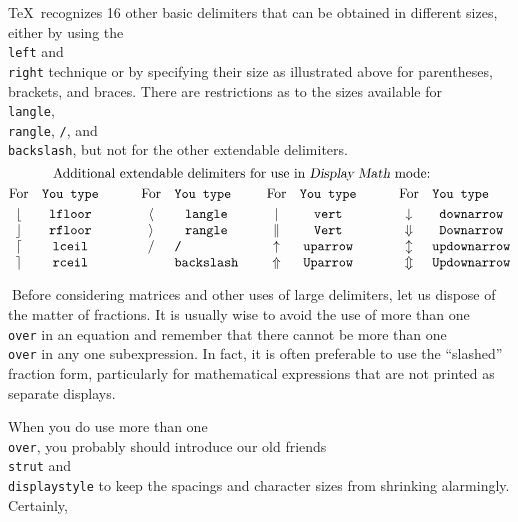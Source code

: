 \TeX\ recognizes 16 other basic
delimiters that can be obtained in different sizes, either by using the {\tt
\\left} and {\tt \\right} technique or by specifying their size as
illustrated above for parentheses, brackets, and braces.
There are restrictions as to the sizes available for {\tt \\langle}, {\tt
\\rangle}, {\tt /}, and {\tt \\backslash}, but not for the other extendable
delimiters.
$$\vbox{\halign{\hfil$#$\hfil\quad&\tt #\hfil\qquad\quad&
\hfil$#$\hfil\quad&\tt #\hfil\qquad&
\hfil$#$\hfil\quad&\tt #\hfil\qquad\quad&
\hfil$#$\hfil\quad&\tt #\hfil\cr
\noalign{\centerline{Additional extendable delimiters for use in {\sl Display Math} mode:}}
\noalign{\vskip3pt}
\hbox{For}&\hbox{You type}&\hbox{For}&\hbox{You type}&
\hbox{For}&\hbox{You type}&\hbox{For}&\hbox{You type}\cr
\noalign{\vskip3pt}
\lfloor&\\lfloor& \langle&\\langle& \vert&\\vert& \downarrow&\\downarrow\cr
\rfloor&\\rfloor& \rangle&\\rangle& \Vert&\\Vert& \Downarrow&\\Downarrow\cr
\lceil&\\lceil& /&/& \uparrow&\\uparrow& \updownarrow&\\updownarrow\cr
\rceil&\\rceil& \\&\\backslash& \Uparrow&\\Uparrow& \Updownarrow&\\Updownarrow\cr
}}$$


Before considering matrices and other uses of large delimiters, let us
dispose of the matter of fractions. It is usually wise to avoid the use of
more than one {\tt \\over} in an equation and
remember that there cannot be more than one {\tt \\over} in any one
subexpression. In fact, it is often preferable to use the ``slashed'' fraction
form, particularly for mathematical expressions that are not printed as separate displays.

When you do use more than one {\tt \\over},
you probably should introduce our old
friends {\tt \\strut} and {\tt \\displaystyle} to keep the spacings
and character sizes from shrinking alarmingly. Certainly,

